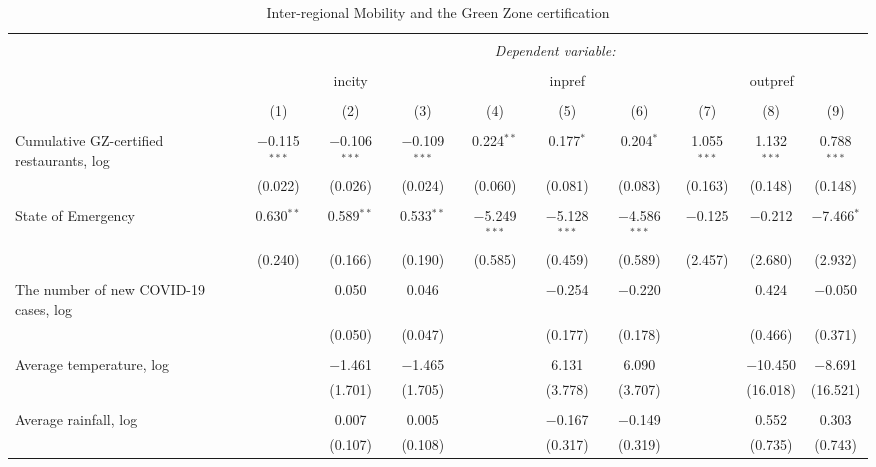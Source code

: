 
\begin{table}[!htbp] \centering 
  \caption{Inter-regional Mobility and the Green Zone certification} 
  \label{} 
\scriptsize 
\begin{tabular}{@{\extracolsep{1pt}}lccccccccc} 
\\[-1.8ex]\hline 
\hline \\[-1.8ex] 
 & \multicolumn{9}{c}{\textit{Dependent variable:}} \\ 
\cline{2-10} 
\\[-1.8ex] & \multicolumn{3}{c}{incity} & \multicolumn{3}{c}{inpref} & \multicolumn{3}{c}{outpref} \\ 
\\[-1.8ex] & (1) & (2) & (3) & (4) & (5) & (6) & (7) & (8) & (9)\\ 
\hline \\[-1.8ex] 
 Cumulative GZ-certified restaurants, log & $-$0.115$^{***}$ & $-$0.106$^{***}$ & $-$0.109$^{***}$ & 0.224$^{**}$ & 0.177$^{*}$ & 0.204$^{*}$ & 1.055$^{***}$ & 1.132$^{***}$ & 0.788$^{***}$ \\ 
  & (0.022) & (0.026) & (0.024) & (0.060) & (0.081) & (0.083) & (0.163) & (0.148) & (0.148) \\ 
  & & & & & & & & & \\ 
 State of Emergency & 0.630$^{**}$ & 0.589$^{**}$ & 0.533$^{**}$ & $-$5.249$^{***}$ & $-$5.128$^{***}$ & $-$4.586$^{***}$ & $-$0.125 & $-$0.212 & $-$7.466$^{*}$ \\ 
  & (0.240) & (0.166) & (0.190) & (0.585) & (0.459) & (0.589) & (2.457) & (2.680) & (2.932) \\ 
  & & & & & & & & & \\ 
 The number of new COVID-19 cases, log &  & 0.050 & 0.046 &  & $-$0.254 & $-$0.220 &  & 0.424 & $-$0.050 \\ 
  &  & (0.050) & (0.047) &  & (0.177) & (0.178) &  & (0.466) & (0.371) \\ 
  & & & & & & & & & \\ 
 Average temperature, log &  & $-$1.461 & $-$1.465 &  & 6.131 & 6.090 &  & $-$10.450 & $-$8.691 \\ 
  &  & (1.701) & (1.705) &  & (3.778) & (3.707) &  & (16.018) & (16.521) \\ 
  & & & & & & & & & \\ 
 Average rainfall, log &  & 0.007 & 0.005 &  & $-$0.167 & $-$0.149 &  & 0.552 & 0.303 \\ 
  &  & (0.107) & (0.108) &  & (0.317) & (0.319) &  & (0.735) & (0.743) \\ 

\end{tabular}
\end{table}

